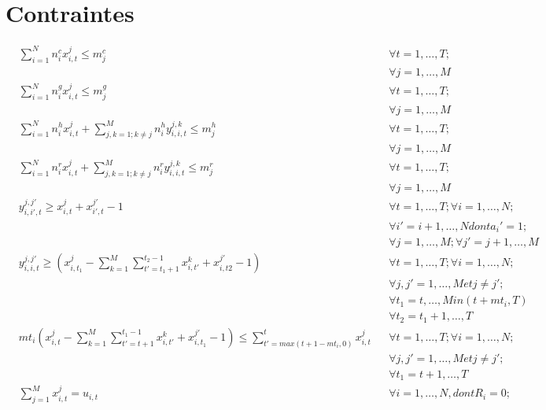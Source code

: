 \section{Contraintes}
\begin{align} 
 &\sum_{i=1}^{N}{n_i^cx_{i,t}^j} \leq m_j^c  &&\forall t=1,\ldots,T; \nonumber \\
 & &&\forall j=1, \ldots, M     \\
 &\sum_{i=1}^{N}{n_i^gx_{i,t}^j} \leq m_j^g  
  &&\forall t=1,\ldots,T; \nonumber \\
 & &&\forall j=1, \ldots, M        \\                
 &\sum_{i=1}^{N}{n_i^hx_{i,t}^j} + \sum_{j,k=1; k\neq j}^M{n_i^hy_{i,i,t}^{j,k}} \leq m_j^h 
   &&\forall t=1,\ldots,T; \nonumber  \\
  & &&\forall j=1, \ldots, M                   \\    
 &\sum_{i=1}^{N}{n_i^rx_{i,t}^j} + \sum_{j,k=1; k\neq j}^M{n_i^ry_{i,i,t}^{j,k}} \leq m_j^r 
   &&\forall  t=1,\ldots,T; \nonumber \\
  & &&\forall j=1, \ldots, M \\
  &y_{i,i\prime,t}^{j,j\prime} \geq x_{i,t}^j + x_{i\prime,t}^{j\prime} - 1 
   &&\forall t=1,\ldots,T; \forall i=1, \ldots, N;    \nonumber \\
  & &&\forall i\prime=i+1,\ldots,N dont a_i\prime = 1;  \nonumber \\
  & &&\forall j=1, \ldots, M;  \forall j\prime=j+1, \ldots, M \\
  &y_{i,i,t}^{j,j\prime} \geq (x_{i,t_1}^j - \sum_{k=1}^M\sum_{t\prime=t_1+1}^{t_2-1}x_{i,t\prime}^k + x_{i,t2}^{j\prime} - 1)
   &&\forall t=1,\ldots,T; \forall i=1, \ldots, N;    \nonumber \\
  & &&\forall j,j\prime=1, \ldots, M et j\neq j\prime;  \nonumber \\
  & &&\forall t_1=t, \ldots, Min(t+mt_i, T) \nonumber \\           
  & &&\forall t_2=t_1+1, \ldots, T \\
  &mt_i(x_{i,t}^j - \sum_{k=1}^M\sum_{t\prime=t+1}^{t_1-1}x_{i,t\prime}^k + x_{i,t_1}^{j\prime} - 1) \leq \sum_{t\prime=max(t+1-mt_i, 0)}^tx_{i,t}^j 
   &&\forall t=1,\ldots,T; \forall i=1, \ldots, N;    \nonumber \\
  & &&\forall j,j\prime=1, \ldots, M et j\neq j\prime;  \nonumber \\
  & &&\forall t_1=t+1, \ldots, T \\
  &\sum_{j=1}^Mx_{i,t}^j = u_{i,t}  &&\forall i=1, \ldots, N, dont R_i=0; \nonumber \\

\end{align}
